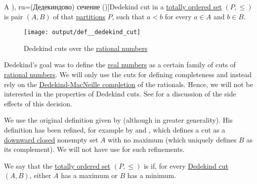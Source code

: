 \begin{definition}\label{def:dedekind_cut}
  A \term[ru=(Дедекиндово) сечение (\cite[34]{Тагамлицки1971Диф}), ru=(Дедекиндово) сечение (\cite[34]{Александров1977Введение})]{Dedekind cut} in a \hyperref[def:totally_ordered_set]{totally ordered set} \( (P, \leq) \) is pair \( (A, B) \) of  that \hyperref[def:set_partition]{partitions} \( P \), such that \( a < b \) for every \( a \in A \) and \( b \in B \).

  \begin{figure}[!ht]
    \centering
    \texttt{[image: output/def\_\_dedekind\_cut]}
    \caption{Dedekind cuts over the \hyperref[def:rational_numbers]{rational numbers}}
    \label{fig:def:dedekind_cut}
  \end{figure}
\end{definition}
\begin{comments}
  \item Dedekind's goal was to define the \hyperref[def:real_numbers]{real numbers} as a certain family of cuts of \hyperref[def:rational_numbers]{rational numbers}. We will only use the cuts for defining completeness and instead rely on the \hyperref[def:dedekind_macnielle_completion]{Dedekind-MacNeille completion} of the rationals. Hence, we will not be interested in the properties of Dedekind cuts. See  for a discussion of the side effects of this decision.

  \item We use the original definition given by  (although in greater generality). His definition has been refined, for example by  and , which defines a cut as a \hyperref[def:closed_ordered_subset]{downward closed} nonempty set \( A \) with no maximum (which uniquely defines \( B \) as its complement). We will not have use for such refinements.
\end{comments}

\begin{definition}\label{def:dedekind_completeness}
  We say that the \hyperref[def:totally_ordered_set]{totally ordered set} \( (P, \leq) \) is  if, for every \hyperref[def:dedekind_cut]{Dedekind cut} \( (A, B) \), either \( A \) has a maximum or \( B \) has a minimum.
\end{definition}

